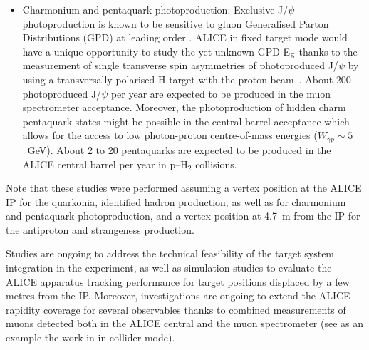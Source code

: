 \documentclass[../report.tex]{subfiles}
\begin{document}
\begin{itemize}
\item{Charmonium and pentaquark photoproduction: Exclusive J/$\psi$ photoproduction is known to be sensitive to gluon Generalised Parton Distributions (GPD) at leading order \cite{Ivanov:2004vd}. ALICE in fixed target mode would have a unique opportunity to study the yet unknown GPD E$_{\rm g}$ thanks to the measurement of single transverse spin asymmetries of photoproduced J/$\psi$ by using a transversally polarised H target with the proton beam~\cite{Massacrier:2017lib,Koempel:2011rc}. About 200 photoproduced J/$\psi$ per year are expected to be produced in the muon spectrometer acceptance. Moreover, the photoproduction of hidden charm pentaquark states \cite{Wang:2015jsa} might be possible in the central barrel acceptance which allows for the access to low photon-proton centre-of-mass energies ($W_{\gamma p} \sim 5$~GeV). About 2 to 20 pentaquarks are expected to be produced in the ALICE central barrel per year in p--H$_{2}$ collisions.}
\end{itemize}

Note that these studies were performed assuming a vertex position at the ALICE IP for the quarkonia, identified hadron production, as well as for charmonium and pentaquark photoproduction, and a vertex position at 4.7~m from the IP for the antiproton and strangeness production. 

Studies are ongoing to address the technical feasibility of the target system integration in the experiment, as well as simulation studies to evaluate the ALICE apparatus tracking performance for target positions displaced by a few metres from the IP. Moreover, investigations are ongoing to extend the ALICE rapidity coverage for several observables thanks to combined measurements of muons detected both in the ALICE central and the muon spectrometer (see as an example the work in \cite{Acharya:2018jua} in collider mode).
\end{document}
